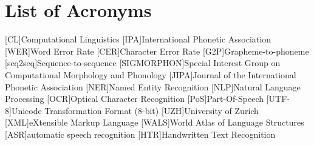 {}
\chapter*{List of Acronyms}
\begin{acronym}
[CL]{Computational Linguistics}
[IPA]{International Phonetic Association}
[WER]{Word Error Rate}
[CER]{Character Error Rate}
[G2P]{Grapheme-to-phoneme} 
[seq2seq]{Sequence-to-sequence} 
[SIGMORPHON]{Special Interest Group on Computational  Morphology and Phonology}
[JIPA]{Journal of the International Phonetic Association}
[NER]{Named Entity Recognition}
[NLP]{Natural Language Processing}
[OCR]{Optical Character Recognition}
[PoS]{Part-Of-Speech}
[UTF-8]{Unicode Transformation Format (8-bit)}
[UZH]{University of Zurich}
[XML]{eXtensible Markup Language}
[WALS]{World Atlas of Language Structures}
[ASR]{automatic speech recognition}
[HTR]{Handwritten Text Recognition}
\end{acronym}